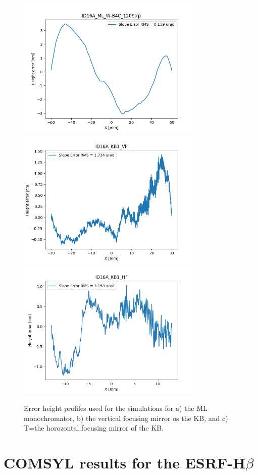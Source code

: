 \documentclass{iucr}              %
\begin{document}
\begin{figure}\label{fig:metrology}
\includegraphics[width=0.8\textwidth]{GRAPHICS/ID16A_ML_W-B4C_120Strp.png}
\includegraphics[width=0.8\textwidth]{GRAPHICS/ID16A_KB1_VF.png}
\includegraphics[width=0.8\textwidth]{GRAPHICS/ID16A_KB1_HF.png}
\caption{Error height profiles used for the simulations for a) the ML monochromator, b) the vertical focusing mirror os the KB, and c) T=the horozontal focusing mirror of the KB.}
\end{figure}

\section{COMSYL results for the ESRF-H$\beta$}





\end{document}
